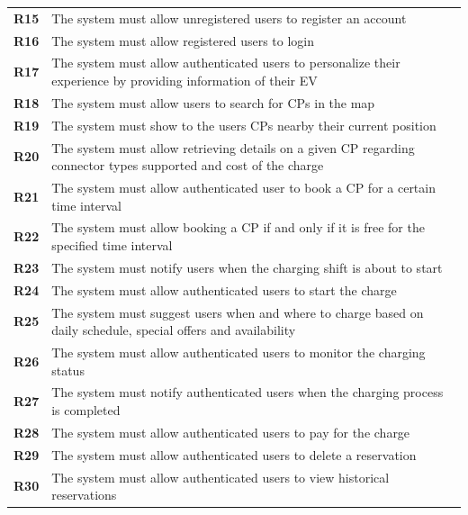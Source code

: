 \begin{table}[H]
    \begin{tabularx}{\textwidth}{cX}
        \toprule
        \textbf{R15} & The system must allow unregistered users to register an account                                                   \\
        \textbf{R16} & The system must allow registered users to login                                                                   \\
        \textbf{R17} & The system must allow authenticated users to personalize their experience by providing information of their EV    \\
        \textbf{R18} & The system must allow users to search for CPs in the map                                                          \\
        \textbf{R19} & The system must show to the users CPs nearby their current position                                               \\
        \textbf{R20} & The system must allow retrieving details on a given CP regarding connector types supported and cost of the charge \\
        \textbf{R21} & The system must allow authenticated user to book a CP for a certain time interval                                 \\
        \textbf{R22} & The system must allow booking a CP if and only if it is free for the specified time interval                      \\
        \textbf{R23} & The system must notify users when the charging shift is about to start                                            \\
        \textbf{R24} & The system must allow authenticated users to start the charge                                                     \\
        \textbf{R25} & The system must suggest users when and where to charge based on daily schedule, special offers and availability   \\
        \textbf{R26} & The system must allow authenticated users to monitor the charging status                                          \\
        \textbf{R27} & The system must notify authenticated users when the charging process is completed                                 \\
        \textbf{R28} & The system must allow authenticated users to pay for the charge                                                   \\
        \textbf{R29} & The system must allow authenticated users to delete a reservation                                                 \\
        \textbf{R30} & The system must allow authenticated users to view historical reservations                                         \\ \bottomrule
    \end{tabularx}
\end{table}


